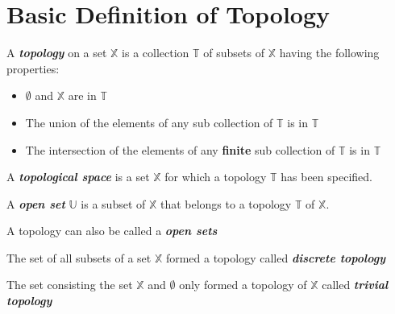 \section{Basic Definition of Topology}

      \begin{definition}[topology]
            A \textit{\textbf{topology}} on a set $ \mathbb{X} $ is a collection $ \mathbb{T} $ of subsets of $ \mathbb{X} $ having the following properties:

            \begin{itemize}
                  \item $ \emptyset $ and $ \mathbb{X} $ are in $ \mathbb{T} $
                  \item The union of the elements of any sub collection of $ \mathbb{T} $ is in $ \mathbb{T} $
                  \item The intersection of the elements of any \textbf{finite} sub collection of $ \mathbb{T} $ is in $ \mathbb{T} $
            \end{itemize} 
      \end{definition}

      \begin{definition}
            A \textit{\textbf{topological space}} is a set $ \mathbb{X} $ for which a topology $ \mathbb{T} $ has been specified.
      \end{definition}
      
      \begin{definition}
            A \textit{\textbf{open set}} $ \mathbb{U} $ is a subset of $ \mathbb{X} $ that belongs to a topology $ \mathbb{T} $ of $ \mathbb{X} $.
      \end{definition}
      
      \begin{definition}
            A topology can also be called a \textit{\textbf{open sets}}
      \end{definition}

      \begin{definition}
            The set of all subsets of a set $ \mathbb{X} $ formed a topology called \textit{\textbf{discrete topology}}
      \end{definition}

      \begin{definition}
            The set consisting the set $ \mathbb{X} $ and $ \emptyset $ only formed a topology of $ \mathbb{X} $ called \textit{\textbf{trivial topology}}
      \end{definition}

